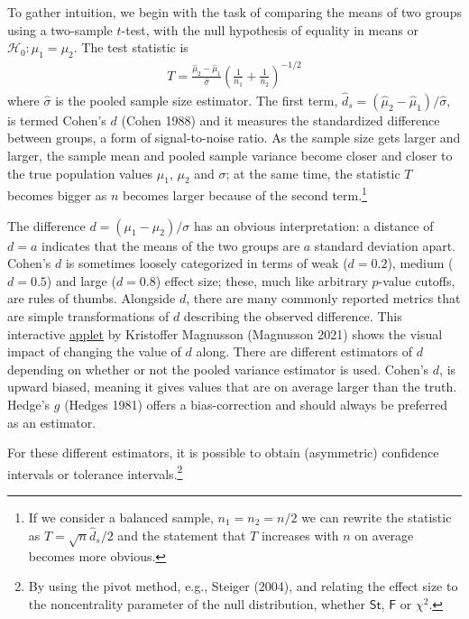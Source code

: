 \documentclass[
  11pt,
  letterpaper,
]{scrbook}
\theoremstyle{definition}
\theoremstyle{definition}
\theoremstyle{remark}
\begin{document}
To gather intuition, we begin with the task of comparing the means of
two groups using a two-sample \(t\)-test, with the null hypothesis of
equality in means or \(\mathscr{H}_0: \mu_1 = \mu_2\). The test
statistic is \begin{align*}
T =  \frac{\widehat{\mu}_2 - \widehat{\mu}_1}{\widehat{\sigma}} \left(\frac{1}{n_1}+\frac{1}{n_2}\right)^{-1/2}
\end{align*} where \(\widehat{\sigma}\) is the pooled sample size
estimator. The first term,
\(\widehat{d}_s = (\widehat{\mu}_2 - \widehat{\mu}_1)/\widehat{\sigma}\),
is termed Cohen's \(d\) (Cohen 1988) and it measures the standardized
difference between groups, a form of signal-to-noise ratio. As the
sample size gets larger and larger, the sample mean and pooled sample
variance become closer and closer to the true population values
\(\mu_1\), \(\mu_2\) and \(\sigma\); at the same time, the statistic
\(T\) becomes bigger as \(n\) becomes larger because of the second
term.\footnote{If we consider a balanced sample, \(n_1 = n_2 = n/2\) we
  can rewrite the statistic as \(T = \sqrt{n} \widehat{d}_s/2\) and the
  statement that \(T\) increases with \(n\) on average becomes more
  obvious.}

The difference \(d=(\mu_1-\mu_2)/\sigma\) has an obvious interpretation:
a distance of \(d=a\) indicates that the means of the two groups are
\(a\) standard deviation apart. Cohen's \(d\) is sometimes loosely
categorized in terms of weak (\(d = 0.2\)), medium (\(d=0.5\)) and large
(\(d=0.8\)) effect size; these, much like arbitrary \(p\)-value cutoffs,
are rules of thumbs. Alongside \(d\), there are many commonly reported
metrics that are simple transformations of \(d\) describing the observed
difference. This interactive
\href{https://rpsychologist.com/cohend/}{applet} by Kristoffer Magnusson
(Magnusson 2021) shows the visual impact of changing the value of \(d\)
along. There are different estimators of \(d\) depending on whether or
not the pooled variance estimator is used. Cohen's \(d\), is upward
biased, meaning it gives values that are on average larger than the
truth. Hedge's \(g\) (Hedges 1981) offers a bias-correction and should
always be preferred as an estimator.

For these different estimators, it is possible to obtain (asymmetric)
confidence intervals or tolerance intervals.\footnote{By using the pivot
  method, e.g., Steiger (2004), and relating the effect size to the
  noncentrality parameter of the null distribution, whether
  \(\mathsf{St}\), \(\mathsf{F}\) or \(\chi^2\).}
\end{document}
